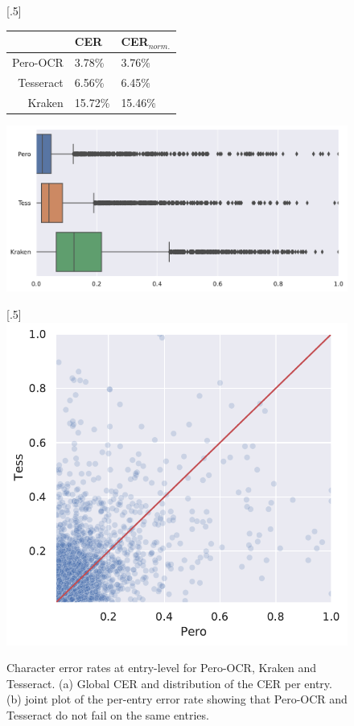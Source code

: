 \begin{figure}

\subcaptionbox{}[.5\linewidth]{
\begin{tabular}{rll}
\toprule
            & CER & CER$_{norm.}$ \\
\midrule
Pero-OCR  & 3.78\% & 3.76\% \\   
Tesseract & 6.56\% & 6.45\% \\
Kraken    & 15.72\% & 15.46\% \\  
\bottomrule
\end{tabular}

\bigskip

\includegraphics[width=\linewidth]{images/ocr-eval-2.pdf}
}
\subcaptionbox{}[.5\linewidth]{
\includegraphics[width=\linewidth]{images/ocr-eval-1.pdf}
}
\caption{Character error rates at entry-level for Pero-OCR, Kraken and Tesseract. (a) Global CER and distribution of the CER per entry. (b)
joint plot of the per-entry error rate showing that Pero-OCR and Tesseract do not fail on the same entries.}  
\label{fig.ocr-results}
\end{figure}

